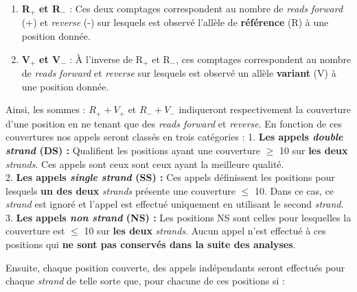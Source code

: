 \documentclass[12pt,twoside]{ugathesis}
\providecommand{\tightlist}{%
  \setlength{\itemsep}{0pt}\setlength{\parskip}{0pt}}
\begin{document}
\begin{enumerate}
\def\labelenumi{\arabic{enumi}.}
\tightlist
\item
  \textbf{R}\(_+\) \textbf{et R}\(_-\) : Ces deux comptages
  correspondent au nombre de \emph{reads} \emph{forward} (+) et
  \emph{reverse} (-) sur lesquels est observé l'allèle de
  \textbf{référence} (R) à une position donnée.\\
\item
  \textbf{V}\(_+\) \textbf{et V}\(_-\) : À l'inverse de R\(_+\) et
  R\(_-\), ces comptages correspondent au nombre de \emph{reads}
  \emph{forward} et \emph{reverse} sur lesquels est observé un allèle
  \textbf{variant} (V) à une position donnée.
\end{enumerate}

Ainsi, les sommes : \(R_+ + V_+\) et \(R_- + V_-\) indiqueront
respectivement la couverture d'une position en ne tenant que des
\emph{reads forward} et \emph{reverse}. En fonction de ces couvertures
nos appels seront classés en trois catégories : 1. \textbf{Les appels
\emph{double strand} (DS) :} Qualifient les positions ayant une
couverture \(\ge\) 10 sur \textbf{les deux} \emph{strands}. Ces appels
sont ceux sont ceux ayant la meilleure qualité.\\
2. \textbf{Les appels \emph{single strand} (SS) :} Ces appels
définissent les positions pour lesquels \textbf{un des deux}
\emph{strands} présente une couverture \(\le\) 10. Dans ce cas, ce
\emph{strand} est ignoré et l'appel est effectué uniquement en utilisant
le second \emph{strand}.\\
3. \textbf{Les appels \emph{non strand} (NS) :} Les positions NS sont
celles pour lesquelles la couverture est \(\le\) 10 sur \textbf{les
deux} \emph{strands}. Aucun appel n'est effectué à ces positions qui
\textbf{ne sont pas conservés dans la suite des analyses}.

Ensuite, chaque position couverte, des appels indépendants seront
effectués pour chaque \emph{strand} de telle sorte que, pour chacune de
ces positions si :
\end{document}
